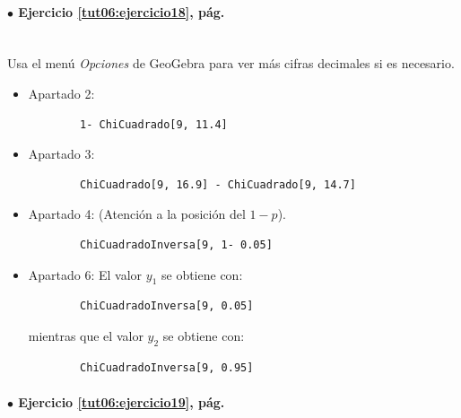 \documentclass[10pt,a4paper]{article}\usepackage[]{graphicx}\usepackage[]{color}
\begin{document}
\paragraph{\bf $\bullet$ Ejercicio \ref{tut06:ejercicio18}, pág. \pageref{tut06:ejercicio18}}
\label{tut06:ejercicio18:sol}\quad\\
Usa el menú {\em Opciones} de GeoGebra para ver más cifras decimales si es necesario.
\begin{itemize}
    \item[] Apartado 2:
        \begin{verbatim}
        1- ChiCuadrado[9, 11.4]
        \end{verbatim}
    \item[]Apartado 3:
        \begin{verbatim}
        ChiCuadrado[9, 16.9] - ChiCuadrado[9, 14.7]
        \end{verbatim}
    \item[]Apartado 4: (Atención a la posición del $1 - p$).
        \begin{verbatim}
        ChiCuadradoInversa[9, 1- 0.05]
        \end{verbatim}
    \item[]Apartado 6: El valor $y_1$ se obtiene con:\\
        \begin{verbatim}
        ChiCuadradoInversa[9, 0.05]
        \end{verbatim}
        \qquad mientras que el valor $y_2$ se obtiene con:
        \begin{verbatim}
        ChiCuadradoInversa[9, 0.95]
        \end{verbatim}
\end{itemize}

\paragraph{\bf $\bullet$ Ejercicio \ref{tut06:ejercicio19}, pág. \pageref{tut06:ejercicio19}}
\label{tut06:ejercicio19:sol}\quad\\
\end{document}
